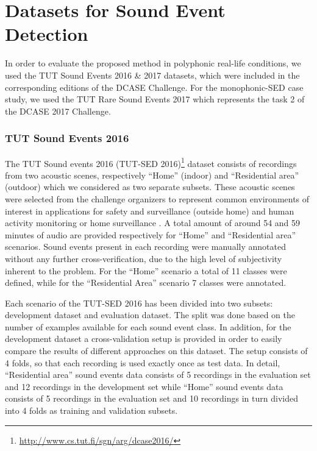 \section{Datasets for Sound Event Detection}
In order to evaluate the proposed method in polyphonic real-life conditions, we used the TUT Sound Events 2016 \& 2017 datasets, which were included in the corresponding editions of the DCASE Challenge. For the monophonic-SED case study, we used the TUT Rare Sound Events 2017 which represents the task 2 of the DCASE 2017 Challenge.

\subsubsection{TUT Sound Events 2016}
The TUT Sound events 2016 (TUT-SED 2016)\footnote{\url{http://www.cs.tut.fi/sgn/arg/dcase2016/}} dataset consists of recordings from two acoustic scenes, respectively ``Home'' (indoor) and ``Residential area'' (outdoor) which we considered as two separate subsets. These acoustic scenes were selected from the challenge organizers to represent common environments of interest in applications for safety and surveillance (outside home) and human activity monitoring or home surveillance \cite{mesaros2016tut}.
A total amount of around 54 and 59 minutes of audio are provided respectively for ``Home'' and ``Residential area'' scenarios.
Sound events present in each recording were manually annotated without any further cross-verification, due to the high level of subjectivity inherent to the problem. 
For the ``Home'' scenario a total of 11 classes were defined, %
while for the ``Residential Area'' scenario 7 classes were annotated. %

Each scenario of the TUT-SED 2016 has been divided into two subsets: development dataset and evaluation dataset. The split was done based on the number of examples available for each sound event class. In addition, for the development dataset a cross-validation setup is provided in order to easily compare the results of different approaches on this dataset. The setup consists of 4 folds, so that each recording is used exactly once as test data. In detail, ``Residential area'' sound events data consists of 5 recordings in the evaluation set and 12 recordings in the development set while ``Home'' sound events data consists of 5
recordings in the evaluation set and 10 recordings in turn divided into 4 folds as training and validation subsets.


